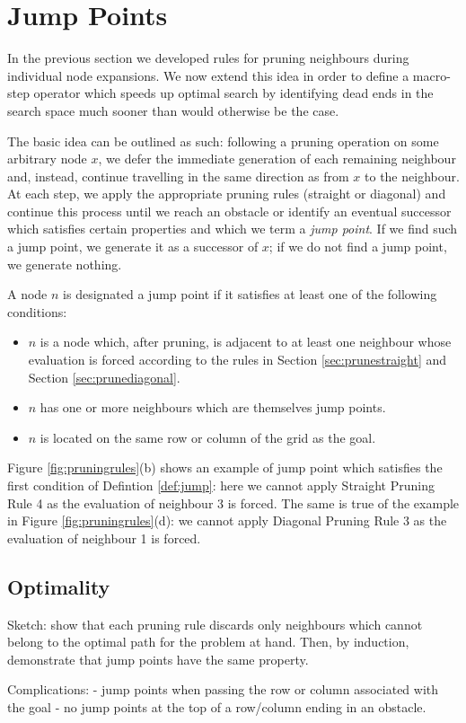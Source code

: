 \section{Jump Points}
In the previous section we developed rules for pruning neighbours during 
individual node expansions. We now extend this idea in order to define a 
macro-step operator which speeds up optimal search by identifying dead ends in the 
search space much sooner than would otherwise be the case.

The basic idea can be outlined as such:  following a pruning operation on some
arbitrary node $x$, we defer the immediate generation of each remaining
neighbour and, instead, continue travelling in the same direction as from $x$
to the neighbour. 
At each step, we apply the appropriate pruning rules (straight or
diagonal) and continue this process until we reach an obstacle or identify an 
eventual successor which satisfies certain properties and which we term a 
\emph{jump point}.
If we find such a jump point, we generate it as a successor of $x$; if we do not 
find a jump point, we generate nothing.

\begin{definition}
\label{def:jump}
A node $n$ is designated a jump point if it satisfies at least one of the following
conditions:
\begin{itemize}
\item{$n$ is a node which, after pruning, is adjacent to at least one neighbour
whose evaluation is forced according to the rules in Section
\ref{sec:prunestraight} and Section \ref{sec:prunediagonal}.}
\item{$n$ has one or more neighbours which are themselves jump points.}
\item{$n$ is located on the same row or column of the grid as the goal.}
\end{itemize}
\end{definition}

\noindent
Figure \ref{fig:pruningrules}(b) shows an example of jump point which satisfies the
first condition of Defintion \ref{def:jump}: here we cannot apply Straight Pruning
Rule 4 as the evaluation of neighbour 3 is forced.
The same is true of the example in Figure \ref{fig:pruningrules}(d): we cannot
apply Diagonal Pruning Rule 3 as the evaluation of neighbour 1 is forced.


\subsection{Optimality}
Sketch: show that each pruning rule discards only neighbours
which cannot belong to the optimal path for the problem at hand.
Then, by induction, demonstrate that jump points have the same 
property. 

Complications:
 - jump points when passing the row or column associated with the goal
 - no jump points at the top of a row/column ending in an obstacle.

